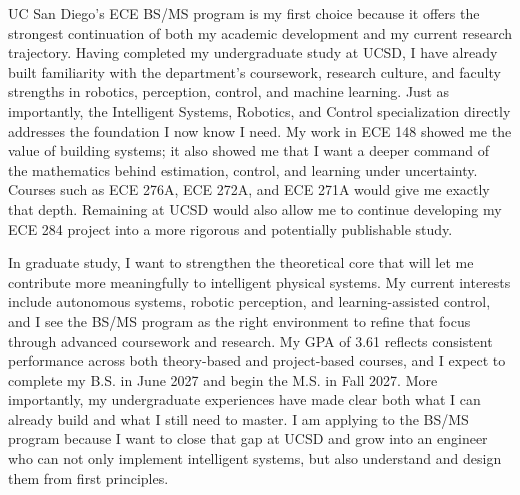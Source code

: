 \documentclass[12pt]{article}
\begin{document}
UC San Diego's ECE BS/MS program is my first choice because it offers the strongest continuation of both my academic development and my current research trajectory. Having completed my undergraduate study at UCSD, I have already built familiarity with the department's coursework, research culture, and faculty strengths in robotics, perception, control, and machine learning. Just as importantly, the Intelligent Systems, Robotics, and Control specialization directly addresses the foundation I now know I need. My work in ECE 148 showed me the value of building systems; it also showed me that I want a deeper command of the mathematics behind estimation, control, and learning under uncertainty. Courses such as ECE 276A, ECE 272A, and ECE 271A would give me exactly that depth. Remaining at UCSD would also allow me to continue developing my ECE 284 project into a more rigorous and potentially publishable study.

In graduate study, I want to strengthen the theoretical core that will let me contribute more meaningfully to intelligent physical systems. My current interests include autonomous systems, robotic perception, and learning-assisted control, and I see the BS/MS program as the right environment to refine that focus through advanced coursework and research. My GPA of 3.61 reflects consistent performance across both theory-based and project-based courses, and I expect to complete my B.S. in June 2027 and begin the M.S. in Fall 2027. More importantly, my undergraduate experiences have made clear both what I can already build and what I still need to master. I am applying to the BS/MS program because I want to close that gap at UCSD and grow into an engineer who can not only implement intelligent systems, but also understand and design them from first principles.
\end{document}
